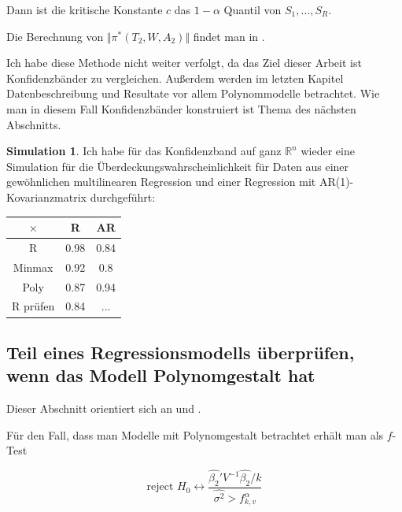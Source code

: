 \documentclass[12pt,a4paper]{article}
\theoremstyle{definition}
\theoremstyle{definition}
\theoremstyle{definition}
\newtheorem{Simulation}[Definition]{Simulation}
\newcommand{\UeberRR}{0.98}
\newcommand{\UeberRMinmax}{0.92}
\newcommand{\UeberRMinmaxPoly}{0.87}
\newcommand{\UeberARR}{0.84}
\newcommand{\UeberARMinmax}{0.8}
\newcommand{\UeberARMinmaxPoly}{0.94}
\newcommand{\UeberRRpruefen}{0.84}
\newcommand{\UeberARRpruefen}{...}
\begin{document}
Dann ist die kritische Konstante $c$ das $1-\alpha$ Quantil von $S_1, \ldots, S_R$.

Die Berechnung von $\Vert \pi^{*}(T_2,W,A_2) \Vert$ findet man in \cite[Appendix B]{Liu64}.

Ich habe diese Methode nicht weiter verfolgt, da das Ziel dieser Arbeit ist Konfidenzbänder zu vergleichen. Außerdem werden im letzten Kapitel Datenbeschreibung und Resultate vor allem Polynommodelle betrachtet. Wie man in diesem Fall Konfidenzbänder konstruiert ist Thema des nächsten Abschnitts.

\begin{Simulation}
Ich habe für das Konfidenzband auf ganz $\mathbb{R}^n$ wieder eine Simulation für die Überdeckungswahrscheinlichkeit für Daten aus einer gewöhnlichen multilinearen Regression und einer Regression mit AR(1)-Kovarianzmatrix durchgeführt:

\begin{center}
\begin{tabular}{|c|c|c|}
\hline 
$\times$ & R & AR \\ 
\hline 
R		& \UeberRR			& \UeberARR \\ 
\hline 
Minmax	& \UeberRMinmax	 	& \UeberARMinmax \\ 
\hline 
Poly 	& \UeberRMinmaxPoly & \UeberARMinmaxPoly \\ 
\hline 
R prüfen	& \UeberRRpruefen & \UeberARRpruefen \\ 
\hline 
\end{tabular} 
\end{center}

\end{Simulation}



\subsection{Teil eines Regressionsmodells überprüfen, wenn das Modell Polynomgestalt hat}
\label{Teil eines Regressionsmodells überpruefen, wenn das Modell Polynomgestalt hat}
Dieser Abschnitt orientiert sich an \cite[190-192]{Liu64} und \cite{Draper98}.

Für den Fall, dass man Modelle mit Polynomgestalt betrachtet erhält man als $f$-Test

\begin{equation}\label{KB hypo prüfen}
\text{reject } H_0 \leftrightarrow \frac{\hat{\beta_2}' V^{-1} \hat{\beta_2}/k}{\widehat{\sigma^2} > f^{\alpha}_{k,v}}
\end{equation}
\end{document}
